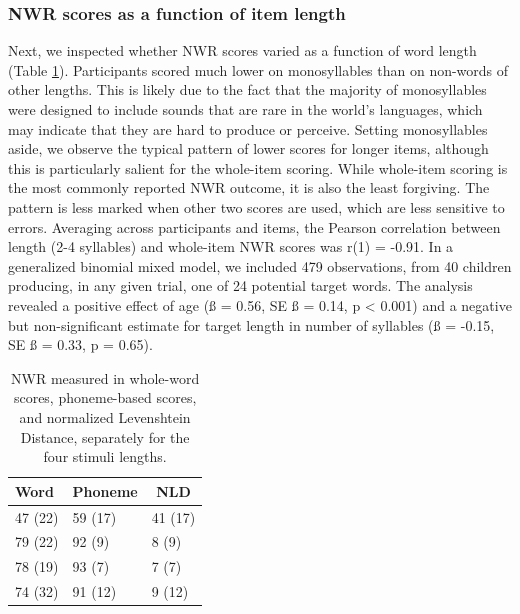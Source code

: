 \documentclass[english,,man,floatsintext]{apa6}
\begin{document}
\hypertarget{nwr-scores-as-a-function-of-item-length}{%
\subsubsection{NWR scores as a function of item length}\label{nwr-scores-as-a-function-of-item-length}}

Next, we inspected whether NWR scores varied as a function of word length (Table \ref{tab:tablength}). Participants scored much lower on monosyllables than on non-words of other lengths. This is likely due to the fact that the majority of monosyllables were designed to include sounds that are rare in the world's languages, which may indicate that they are hard to produce or perceive. Setting monosyllables aside, we observe the typical pattern of lower scores for longer items, although this is particularly salient for the whole-item scoring. While whole-item scoring is the most commonly reported NWR outcome, it is also the least forgiving. The pattern is less marked when other two scores are used, which are less sensitive to errors. Averaging across participants and items, the Pearson correlation between length (2-4 syllables) and whole-item NWR scores was r(1) = -0.91. In a generalized binomial mixed model, we included 479 observations, from 40 children producing, in any given trial, one of 24 potential target words. The analysis revealed a positive effect of age (ß = 0.56, SE ß = 0.14, p \textless{} 0.001) and a negative but non-significant estimate for target length in number of syllables (ß = -0.15, SE ß = 0.33, p = 0.65).

\begin{table}[tbp]

\begin{center}
\begin{threeparttable}

\caption{\label{tab:tablength}NWR measured in whole-word scores, phoneme-based scores, and normalized Levenshtein Distance, separately for the four stimuli lengths.}

\begin{tabular}{lll}
\toprule
Word & \multicolumn{1}{c}{Phoneme} & \multicolumn{1}{c}{NLD}\\
\midrule
47 (22) & 59 (17) & 41 (17)\\
79 (22) & 92 (9) & 8 (9)\\
78 (19) & 93 (7) & 7 (7)\\
74 (32) & 91 (12) & 9 (12)\\
\bottomrule
\end{tabular}

\end{threeparttable}
\end{center}

\end{table}
\end{document}
